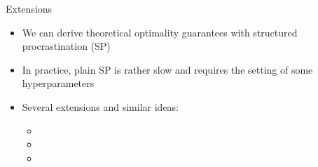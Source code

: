 \begin{frame}[c,fragile]{Extensions}

\begin{itemize}
	\item We can derive theoretical optimality guarantees with structured procrastination (SP)
	\pause
	\item In practice, plain SP is rather slow and requires the setting of some hyperparameters
	\pause
	\item Several extensions and similar ideas:
	\begin{itemize}
		\item {}
		\item {}
		\item {}
	\end{itemize}
\end{itemize}
\end{frame}



